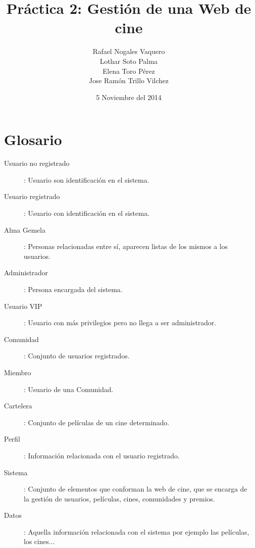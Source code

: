 \documentclass{article}
\title{Práctica 2: Gestión de una Web de cine}
\author{Rafael Nogales Vaquero
\\Lothar Soto Palma
\\Elena Toro Pérez
\\Jose Ramón Trillo Vilchez}
\date{5 Noviembre del 2014}
\begin{document}
\maketitle
{}

\section{Glosario}
\begin{description}
	\item[Usuario no registrado]: Usuario son identificación en el sistema.
	\item[Usuario registrado]: Usuario con identificación en el sistema.
	\item[Alma Gemela]: Personas relacionadas entre sí, aparecen listas de los mismos a los usuarios.
	\item[Administrador]: Persona encargada del sistema.
	\item[Usuario VIP]: Usuario con más privilegios pero no llega a ser administrador.
	\item[Comunidad]: Conjunto de usuarios registrados.
	\item[Miembro]: Usuario de una Comunidad.
	\item[Cartelera]: Conjunto de películas de un cine determinado.
	\item[Perfil]: Información relacionada con el usuario registrado.
	\item[Sistema]: Conjunto de elementos que conforman la web de cine, que se encarga de la gestión de usuarios, películas, cines, comunidades y premios.
	\item[Datos]: Aquella información relacionada con el sistema por ejemplo las películas, los cines...
\end{description}
\end{document}
